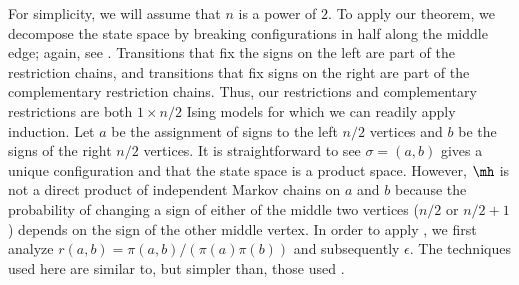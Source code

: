 \documentclass{toc}
\begin{document}
\noindent For simplicity, we will assume that $n$ is a power of $2$. To 
apply our theorem, we decompose the state space by breaking 
configurations in half along the middle edge; again, see 
.  Transitions that fix the signs on the left are 
part of the restriction chains, and transitions that fix signs on the 
right are part of the complementary restriction chains.  Thus, our 
restrictions and complementary restrictions are both $1 \times n/2$ 
Ising models for which we can readily apply induction.  Let $a$ be the 
assignment of signs to the left $n/2$ vertices and $b$ be the signs of 
the right $n/2$ vertices.  It is straightforward to see $\sigma = 
(a,b)$ gives a unique configuration and that the state space is a 
product space.  However, $\mh$ is not a direct product of independent 
Markov chains on $a$ and $b$ because the probability of changing a sign 
of either of the middle two vertices ($n/2$ or $n/2+1$) depends on the 
sign of the other middle vertex. In order to apply 
, we first analyze $r(a,b) = \pi(a,b)/ 
(\pi(a)\pi(b))$ and subsequently $\epsilon$.  The techniques used here 
are similar to, but simpler than, those used . 
\end{document}
